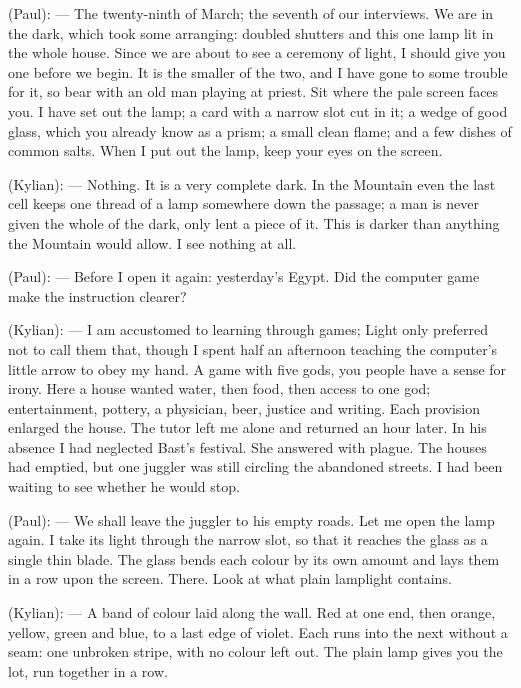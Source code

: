 
\begin{room}

(Paul): --- The twenty-ninth of March; the seventh of our interviews. We are in the dark, which took some arranging: doubled shutters and this one lamp lit in the whole house. Since we are about to see a ceremony of light, I should give you one before we begin. It is the smaller of the two, and I have gone to some trouble for it, so bear with an old man playing at priest. Sit where the pale screen faces you. I have set out the lamp; a card with a narrow slot cut in it; a wedge of good glass, which you already know as a prism; a small clean flame; and a few dishes of common salts. When I put out the lamp, keep your eyes on the screen.

(Kylian): --- Nothing. It is a very complete dark. In the Mountain even the last cell keeps one thread of a lamp somewhere down the passage; a man is never given the whole of the dark, only lent a piece of it. This is darker than anything the Mountain would allow. I see nothing at all.

(Paul): --- Before I open it again: yesterday's Egypt. Did the computer game make the instruction clearer?

(Kylian): --- I am accustomed to learning through games; Light only preferred not to call them that, though I spent half an afternoon teaching the computer's little arrow to obey my hand. A game with five gods, you people have a sense for irony. Here a house wanted water, then food, then access to one god; entertainment, pottery, a physician, beer, justice and writing. Each provision enlarged the house. The tutor left me alone and returned an hour later. In his absence I had neglected Bast's festival. She answered with plague. The houses had emptied, but one juggler was still circling the abandoned streets. I had been waiting to see whether he would stop.

(Paul): --- We shall leave the juggler to his empty roads. Let me open the lamp again. I take its light through the narrow slot, so that it reaches the glass as a single thin blade. The glass bends each colour by its own amount and lays them in a row upon the screen. There. Look at what plain lamplight contains.

(Kylian): --- A band of colour laid along the wall. Red at one end, then orange, yellow, green and blue, to a last edge of violet. Each runs into the next without a seam: one unbroken stripe, with no colour left out. The plain lamp gives you the lot, run together in a row.


\end{room}
